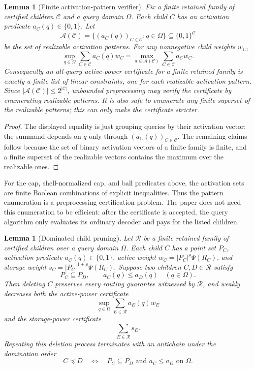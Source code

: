 \documentclass[10pt]{article}
\newtheorem{lemma}[theorem]{Lemma}
\theoremstyle{definition}
\begin{document}
\begin{lemma}[Finite activation-pattern verifier]\label{lem:finite-activation-patterns}
   Fix a finite retained family of certified children $\mathcal C$ and a query
   domain $\Omega$.  Each child $C$ has an activation predicate
   $a_C(q)\in\{0,1\}$.  Let
   \[
      \mathcal A(\mathcal C)
      =
      \bigl\{
         (a_C(q))_{C\in\mathcal C}:q\in\Omega
      \bigr\}
      \subseteq\{0,1\}^{\mathcal C}
   \]
   be the set of realizable activation patterns.  For any nonnegative child
   weights $w_C$,
   \[
      \sup_{q\in\Omega}\sum_{C\in\mathcal C}a_C(q)w_C
      =
      \max_{a\in\mathcal A(\mathcal C)}
      \sum_{C\in\mathcal C}a_Cw_C .
   \]
   Consequently an all-query active-power certificate for a finite retained
   family is exactly a finite list of linear constraints, one for each
   realizable activation pattern.  Since
   $|\mathcal A(\mathcal C)|\le2^{|\mathcal C|}$, unbounded preprocessing may
   verify the certificate by enumerating realizable patterns.  It is also safe
   to enumerate any finite superset of the realizable patterns; this can only
   make the certificate stricter.
\end{lemma}

\begin{proof}
   The displayed equality is just grouping queries by their activation vector:
   the summand depends on $q$ only through $(a_C(q))_{C\in\mathcal C}$.  The
   remaining claims follow because the set of binary activation vectors of a
   finite family is finite, and a finite superset of the realizable vectors
   contains the maximum over the realizable ones.
\end{proof}

For the cap, shell-normalized cap, and ball predicates above, the activation
sets are finite Boolean combinations of explicit inequalities.  Thus the
pattern enumeration is a preprocessing certification problem.  The paper does
not need this enumeration to be efficient: after the certificate is accepted,
the query algorithm only evaluates its ordinary decoder and pays for the listed
children.

\begin{lemma}[Dominated child pruning]\label{lem:dominated-child-pruning}
   Let $\mathcal R$ be a finite retained family of certified children over a
   query domain $\Omega$.  Each child $C$ has a point set $P_C$, activation
   predicate $a_C(q)\in\{0,1\}$, active weight
   $w_C=|P_C|^\rho\Psi(R_C)$, and storage weight
   $s_C=|P_C|^{1+\rho}\Psi(R_C)$.  Suppose two children $C,D\in\mathcal R$
   satisfy
   \[
      P_C\subseteq P_D,
      \qquad
      a_C(q)\le a_D(q)\quad(q\in\Omega).
   \]
   Then deleting $C$ preserves every routing guarantee witnessed by
   $\mathcal R$, and weakly decreases both the active-power certificate
   \[
      \sup_{q\in\Omega}\sum_{E\in\mathcal R}a_E(q)w_E
   \]
   and the storage-power certificate
   \[
      \sum_{E\in\mathcal R}s_E .
   \]
   Repeating this deletion process terminates with an antichain under the
   domination order
   \[
      C\preceq D
      \quad\Longleftrightarrow\quad
      P_C\subseteq P_D\text{ and }a_C\le a_D\text{ on }\Omega .
   \]
\end{lemma}
\end{document}

